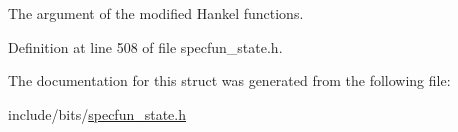 The argument of the modified Hankel functions. 



Definition at line 508 of file specfun\+\_\+state.\+h.



The documentation for this struct was generated from the following file\+:\begin{DoxyCompactItemize}
\item 
include/bits/\hyperlink{specfun__state_8h}{specfun\+\_\+state.\+h}\end{DoxyCompactItemize}
